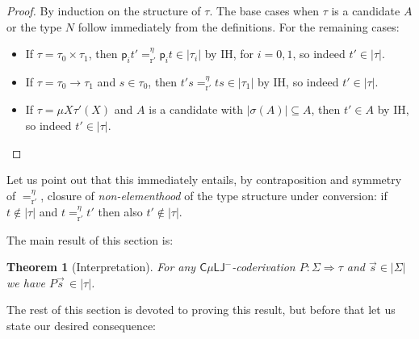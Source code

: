 \documentclass[10pt,a4paper]{amsart}
\theoremstyle{plain}
\newtheorem{theorem}[theorem]{Theorem}
\newtheorem{observation}[observation]{Observation}
\theoremstyle{definition}
\newcommand{\anupam}[1]{\todo[color=green]{A: #1}}
\renewcommand{\todo}[1]{}
\renewcommand{\anupam}[1]{}
\theoremstyle{plain}
\theoremstyle{definition} %
\newcommand{\numeral}[1]{\underline{#1}}
\newcommand{\Nat}{\mathbb{N}}
\newcommand{\nat}{\mathit{N}}
\newcommand{\N}{\nat} %
\newcommand{\seqar}{\Rightarrow}
\newcommand{\LJ}{\mathsf{LJ}}
\newcommand{\muLJ}{\mu\LJ}
\newcommand{\circular}{\mathsf C}
\newcommand{\cmuLJ}{\circular\muLJ}
\newcommand{\cmuLJneg}{\cmuLJ^-}
\newcommand{\proj}[1]{\mathsf{p}_{#1}}
\newcommand{\reductionnorec}{\mathrm{r}'}
\newcommand{\convertsnorec}{=_{\reductionnorec}}
\newcommand{\convertsnoreceta}{=_{\reductionnorec}^\eta} %
\newcommand{\der}{P}
\newcommand{\hr}[1]{|#1|}
\begin{document}
\begin{proof}
    By induction on the structure of $\tau$.
    The base cases when $\tau$ is a candidate $A$ or the type $\nat$ follow immediately from the definitions. For the remaining cases:
    \begin{itemize}
        \item If $\tau = \tau_0 \times \tau_1$, then $\proj i t' \convertsnoreceta \proj i t \in \hr{\tau_i}$ by IH, for $i=0,1$, so indeed $t'\in \hr \tau$.
        \item If $\tau = \tau_0 \to \tau_1$ and $s \in \tau_0$, then $t's \convertsnoreceta ts \in \hr{\tau_1}$ by IH, so indeed $t'\in \hr\tau$.
        \item If $\tau = \mu X \tau'(X)$ and $A$ is a candidate with $\hr{\sigma(A)} \subseteq A$, then $t' \in A$ by IH, so indeed $t'\in \hr\tau$.\qedhere
    \end{itemize}
\end{proof}


Let us point out that this immediately entails, by contraposition and symmetry of $\convertsnoreceta$, closure of \emph{non-elementhood} of the type structure under conversion: if $t\notin \hr \tau$ and $t\convertsnoreceta t'$ then also $t'\notin \hr\tau$.


The main result of this section is:
\begin{theorem}
[Interpretation]
\label{thm:prog-implies-hr}
For any $\cmuLJneg$-coderivation $\der:\Sigma \seqar \tau$ and $\vec s \in \hr\Sigma$ we have $\der\vec s \, \in  \hr{ \tau}$.
\end{theorem}

\anupam{I moved the proof of this to the end of section, as it is way too early here. We need the notions built up over the next subsections for it to make sense. Added sentence below.}

The rest of this section is devoted to proving this result, but before that let us state our desired consequence:


\end{document}
